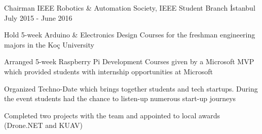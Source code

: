 

\begin{cventries}

  \cventry
    {Chairman} %
    {IEEE Robotics \& Automation Society, IEEE Student Branch} %
    {İstanbul} %
    {July 2015 - June 2016} %
    {
      \begin{cvitems} %
        \item {Hold 5-week Arduino \& Electronics Design Courses for the freshman engineering majors in the Koç University}
        \item {Arranged 5-week Raspberry Pi Development Courses given by a Microsoft MVP which provided students with internship opportunities at Microsoft}
        \item{Organized Techno-Date which brings together students and tech startups. During the event students had the chance to listen-up numerous start-up journeys}
        \item{Completed two projects with the team and appointed to local awards (Drone.NET and KUAV)}
      \end{cvitems}
    }


\end{cventries}

